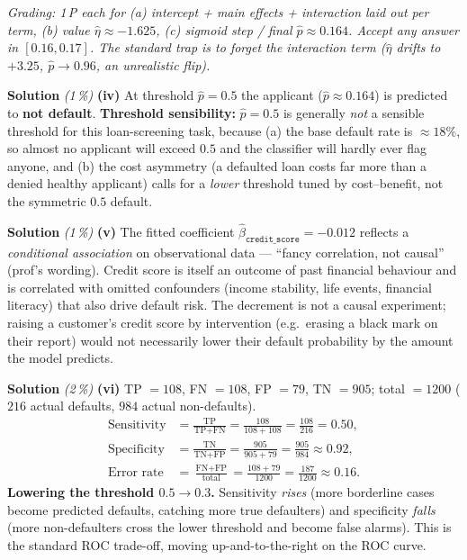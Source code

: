 \documentclass[11pt,a4paper]{article}
\newcommand{\subpoints}[1]{\textit{(#1\,\%)}}
\newcommand{\sol}{\noindent\textbf{Solution}}
\begin{document}
\noindent\emph{Grading: 1\,P each for (a) intercept + main effects + interaction laid out per term,
(b) value $\hat\eta \approx -1.625$, (c) sigmoid step / final $\hat p \approx 0.164$. Accept any
answer in $[0.16, 0.17]$. The standard trap is to forget the interaction term ($\hat\eta$ drifts
to $+3.25$, $\hat p \to 0.96$, an unrealistic flip).}

\medskip
\sol{} \subpoints{1} \textbf{(iv)} At threshold $\hat p = 0.5$ the applicant ($\hat p \approx 0.164$)
is predicted to \textbf{not default}. \textbf{Threshold sensibility:} $\hat p = 0.5$ is generally
\emph{not} a sensible threshold for this loan-screening task, because (a) the base default rate is
$\approx 18\%$, so almost no applicant will exceed $0.5$ and the classifier will hardly ever flag
anyone, and (b) the cost asymmetry (a defaulted loan costs far more than a denied healthy
applicant) calls for a \emph{lower} threshold tuned by cost--benefit, not the symmetric $0.5$
default.

\medskip
\sol{} \subpoints{1} \textbf{(v)} The fitted coefficient $\hat\beta_{\texttt{credit\_score}} = -0.012$
reflects a \emph{conditional association} on observational data --- ``fancy correlation, not
causal'' (prof's wording). Credit score is itself an outcome of past financial behaviour and is
correlated with omitted confounders (income stability, life events, financial literacy) that also
drive default risk. The decrement is not a causal experiment; raising a customer's credit score by
intervention (e.g.\ erasing a black mark on their report) would not necessarily lower their
default probability by the amount the model predicts.

\medskip
\sol{} \subpoints{2} \textbf{(vi)} TP $= 108$, FN $= 108$, FP $= 79$, TN $= 905$; total $= 1200$
($216$ actual defaults, $984$ actual non-defaults).
\begin{align*}
\text{Sensitivity} &= \frac{\text{TP}}{\text{TP}+\text{FN}} = \frac{108}{108 + 108} = \frac{108}{216}
   = \boxed{0.50}, \\
\text{Specificity} &= \frac{\text{TN}}{\text{TN}+\text{FP}} = \frac{905}{905 + 79} = \frac{905}{984}
   \approx \boxed{0.92}, \\
\text{Error rate} &= \frac{\text{FN} + \text{FP}}{\text{total}} = \frac{108 + 79}{1200}
   = \frac{187}{1200} \approx \boxed{0.16}.
\end{align*}
\textbf{Lowering the threshold $0.5 \to 0.3$.} Sensitivity \emph{rises} (more borderline cases
become predicted defaults, catching more true defaulters) and specificity \emph{falls} (more
non-defaulters cross the lower threshold and become false alarms). This is the standard ROC
trade-off, moving up-and-to-the-right on the ROC curve.
\end{document}
